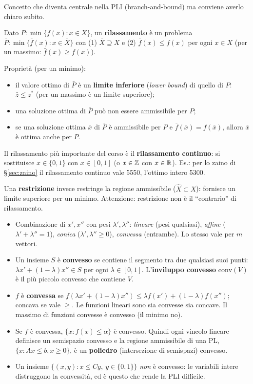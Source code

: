 \begin{extra}
Concetto che diventa centrale nella PLI (branch-and-bound) ma conviene averlo chiaro subito.

Dato $P:\min\{f(x):x\in X\}$, un \textbf{rilassamento} è un problema $\bar P:\min\{\bar f(x):x\in \bar X\}$ con
(1) $\bar X\supseteq X$ e (2) $\bar f(x)\le f(x)$ per ogni $x\in X$ (per un massimo: $\bar f(x)\ge f(x)$).

Proprietà (per un minimo):
\begin{itemize}[nosep]
\item il valore ottimo di $\bar P$ è un \textbf{limite inferiore} (\emph{lower bound}) di quello di $P$: $\bar z\le z^*$ (per un massimo è un limite superiore);
\item una soluzione ottima di $\bar P$ può non essere ammissibile per $P$;
\item se una soluzione ottima $\bar x$ di $\bar P$ è ammissibile per $P$ e $\bar f(\bar x)=f(\bar x)$, allora $\bar x$ è ottima anche per $P$.
\end{itemize}
Il rilassamento più importante del corso è il \textbf{rilassamento continuo}: si sostituisce $x\in\{0,1\}$ con $x\in[0,1]$ (o $x\in\mathbb{Z}$ con $x\in\mathbb{R}$). Es.: per lo zaino di \S\ref{sec:zaino} il rilassamento continuo vale 5550, l'ottimo intero 5300.

Una \textbf{restrizione} invece restringe la regione ammissibile ($\hat X\subset X$): fornisce un limite superiore per un minimo. Attenzione: restrizione non è il ``contrario'' di rilassamento.
\end{extra}

\begin{extra}
\begin{itemize}[nosep]
\item Combinazione di $x',x''$ con pesi $\lambda',\lambda''$: \emph{lineare} (pesi qualsiasi), \emph{affine} ($\lambda'+\lambda''=1$), \emph{conica} ($\lambda',\lambda''\ge0$), \emph{convessa} (entrambe). Lo stesso vale per $m$ vettori.
\item Un insieme $S$ è \textbf{convesso} se contiene il segmento tra due qualsiasi suoi punti: $\lambda x'+(1-\lambda)x''\in S$ per ogni $\lambda\in[0,1]$. L'\textbf{inviluppo convesso} $\mathrm{conv}(V)$ è il più piccolo convesso che contiene $V$.
\item $f$ è \textbf{convessa} se $f(\lambda x'+(1-\lambda)x'')\le \lambda f(x')+(1-\lambda)f(x'')$; concava se vale $\ge$. Le funzioni lineari sono sia convesse sia concave. Il massimo di funzioni convesse è convesso (il minimo no).
\item Se $f$ è convessa, $\{x: f(x)\le\alpha\}$ è convesso. Quindi ogni vincolo lineare definisce un semispazio convesso e la regione ammissibile di una PL, $\{x:Ax\le b,x\ge0\}$, è un \textbf{poliedro} (intersezione di semispazi) convesso.
\item Un insieme $\{(x,y): x\le Cy,\ y\in\{0,1\}\}$ \emph{non} è convesso: le variabili intere distruggono la convessità, ed è questo che rende la PLI difficile.
\end{itemize}
\end{extra}
